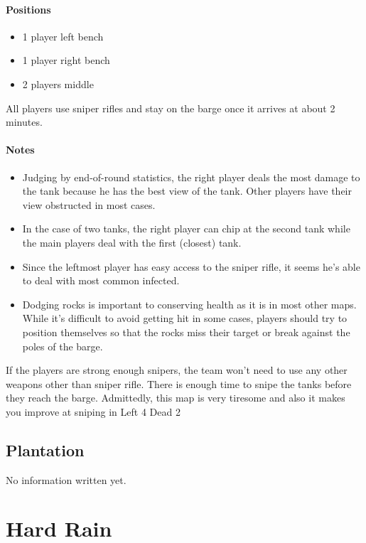 \paragraph{Positions}
\begin{itemize}
\item 1 player left bench
\item 1 player right bench
\item 2 players middle 
\end{itemize}

All players use sniper rifles and stay on the barge once it arrives at about 2 minutes.

\paragraph{Notes}
\begin{itemize}
\item Judging by end-of-round statistics, the right player deals the most damage to the tank because he has the best view of the tank. Other players have their view obstructed in most cases.
\item In the case of two tanks, the right player can chip at the second tank while the main players deal with the first (closest) tank.
\item Since the leftmost player has easy access to the sniper rifle, it seems he's able to deal with most common infected.
\item Dodging rocks is important to conserving health as it is in most other maps. While it's difficult to avoid getting hit in some cases, players should try to position themselves so that the rocks miss their target or break against the poles of the barge.
\end{itemize}

If the players are strong enough snipers, the team won't need to use any other weapons other than sniper rifle. There is enough time to snipe the tanks before they reach the barge. Admittedly, this map is very tiresome and also it makes you improve at sniping in Left 4 Dead 2

\subsection{Plantation}
No information written yet.

\section{Hard Rain}

